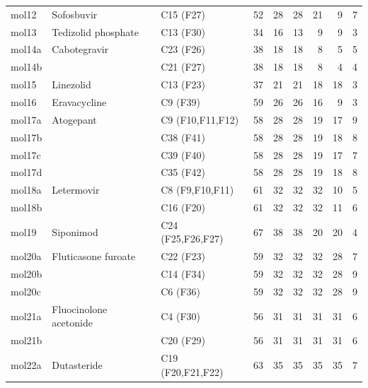 \documentclass[11pt]{article}
\begin{document}
\begin{longtable}{@{}l l l r r r r r r@{}}
mol12    & Sofosbuvir               & C15 (F27)              &  52 &  28 &  28 &  21 &   9 &   7 \\
mol13    & Tedizolid phosphate      & C13 (F30)              &  34 &  16 &  13 &   9 &   9 &   3 \\
mol14a   & Cabotegravir             & C23 (F26)              &  38 &  18 &  18 &   8 &   5 &   5 \\
mol14b   &                          & C21 (F27)              &  38 &  18 &  18 &   8 &   4 &   4 \\
mol15    & Linezolid                & C13 (F23)              &  37 &  21 &  21 &  18 &  18 &   3 \\
mol16    & Eravacycline             & C9 (F39)               &  59 &  26 &  26 &  16 &   9 &   3 \\
mol17a   & Atogepant                & C9 (F10,F11,F12)       &  58 &  28 &  28 &  19 &  17 &   9 \\
mol17b   &                          & C38 (F41)              &  58 &  28 &  28 &  19 &  18 &   8 \\
mol17c   &                          & C39 (F40)              &  58 &  28 &  28 &  19 &  17 &   7 \\
mol17d   &                          & C35 (F42)              &  58 &  28 &  28 &  19 &  18 &   8 \\
mol18a   & Letermovir               & C8 (F9,F10,F11)        &  61 &  32 &  32 &  32 &  10 &   5 \\
mol18b   &                          & C16 (F20)              &  61 &  32 &  32 &  32 &  11 &   6 \\
mol19    & Siponimod                & C24 (F25,F26,F27)      &  67 &  38 &  38 &  20 &  20 &   4 \\
mol20a   & Fluticasone furoate      & C22 (F23)              &  59 &  32 &  32 &  32 &  28 &   7 \\
mol20b   &                          & C14 (F34)              &  59 &  32 &  32 &  32 &  28 &   9 \\
mol20c   &                          & C6 (F36)               &  59 &  32 &  32 &  32 &  28 &   9 \\
mol21a   & Fluocinolone acetonide   & C4 (F30)               &  56 &  31 &  31 &  31 &  31 &   6 \\
mol21b   &                          & C20 (F29)              &  56 &  31 &  31 &  31 &  31 &   6 \\
mol22a   & Dutasteride              & C19 (F20,F21,F22)      &  63 &  35 &  35 &  35 &  35 &   7 \\

\end{longtable}
\end{document}
